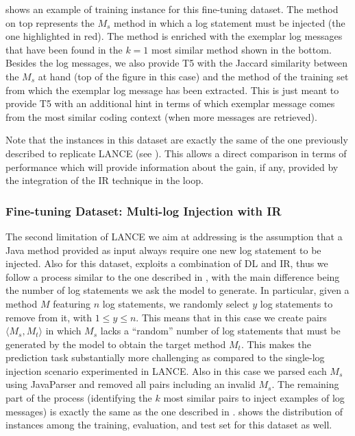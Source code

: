  shows an example of training instance for this fine-tuning dataset. The method on top represents the $M_{s}$ \java method in which a log statement must be injected (\ie the one highlighted in red). The method is enriched with the exemplar log messages that have been found in the $k=1$ most similar method shown in the bottom. Besides the log messages, we also provide T5 with the Jaccard similarity between the $M_{s}$ at hand (top of the figure in this case) and the method of the training set from which the exemplar log message has been extracted. This is just meant to provide T5 with an additional hint in terms of which exemplar message comes from the most similar coding context (when more messages are retrieved).

Note that the instances in this dataset are exactly the same of the one previously described to replicate LANCE (see ). This allows a direct comparison in terms of performance which will provide information about the gain, if any, provided by the integration of the IR technique in the loop.


\subsubsection{Fine-tuning Dataset: Multi-log Injection with IR} \label{sec:multi-log-dataset}

The second limitation of LANCE \cite{mastropaolo2022using} we aim at addressing is the assumption that a Java method provided as input always require one new log statement to be injected. Also for this dataset, \approach exploits a combination of DL and IR, thus we follow a process similar to the one described in , with the main difference being the number of log statements we ask the model to generate. In particular, given a method $M$ featuring $n$ log statements, we randomly select $y$ log statements to remove from it, with $1 \leq y \leq n$. This means that in this case we create pairs $\langle M_s, M_t \rangle$ in which $M_s$ lacks a ``random'' number of log statements that must be generated by the model to obtain the target method $M_t$. This makes the prediction task substantially more challenging as compared to the single-log injection scenario experimented in LANCE. Also in this case we parsed each $M_s$ using JavaParser \cite{javaparser} and removed all pairs including an invalid $M_s$. The remaining part of the process (\ie identifying the $k$ most similar pairs to inject examples of log messages) is exactly the same as the one described in .  shows the distribution of instances among the training, evaluation, and test set for this dataset as well.


